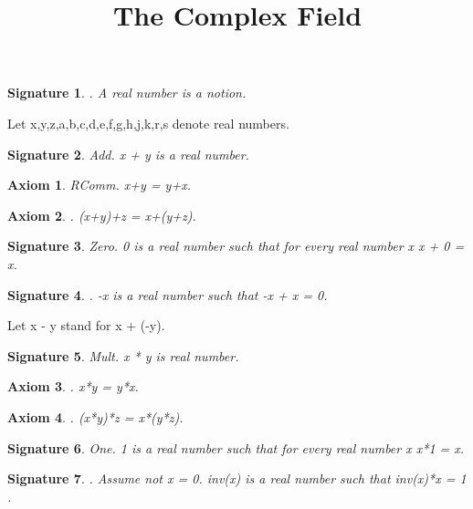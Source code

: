 \documentclass{article}
\newenvironment{forthel}{\begin{leftbar}}{\end{leftbar}}
\newtheorem{axiom}{Axiom}
\newtheorem{signature}{Signature}
\begin{document}
\title{The Complex Field}

\maketitle

\begin{forthel}
[set/-s] [element/-s] [number/-s]
\begin{signature}. A real number is a notion.

\end{signature}


Let x,y,z,a,b,c,d,e,f,g,h,j,k,r,s denote real numbers.



\begin{signature} Add. x + y is a real number.

\end{signature}
\begin{axiom} RComm. x+y = y+x.

\end{axiom}
\begin{axiom}. (x+y)+z = x+(y+z).

\end{axiom}
\begin{signature} Zero. 0 is a real number such that for every real number x x + 0 = x.

\end{signature}
\begin{signature}. -x is a real number such that -x + x = 0.

\end{signature}

Let x - y stand for x + (-y).

\begin{signature} Mult. x * y is real number.

\end{signature}
\begin{axiom}. x*y = y*x.

\end{axiom}
\begin{axiom}. (x*y)*z = x*(y*z).

\end{axiom}
\begin{signature} One. 1 is a real number such that for every real number x x*1 = x.

\end{signature}
\begin{signature}. Assume not x = 0. inv(x) is a real number such that inv(x)*x = 1 .


\end{signature}
\end{forthel}
\end{document}
